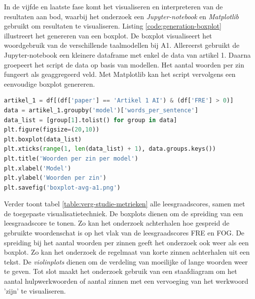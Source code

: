 In de vijfde en laatste fase komt het visualiseren en interpreteren van de resultaten aan bod, waarbij het onderzoek een \textit{Jupyter-notebook} en \textit{Matplotlib} gebruikt om resultaten te visualiseren. Listing \ref{code:generation-boxplot} illustreert het genereren van een boxplot. De boxplot visualiseert het woordgebruik van de verschillende taalmodellen bij A1. Allereerst gebruikt de Jupyter-notebook een kleinere dataframe met enkel de data van artikel 1. Daarna groepeert het script de data op basis van modellen. Het aantal woorden per zin fungeert als geaggregeerd veld. Met Matplotlib kan het script vervolgens een eenvoudige boxplot genereren.


\begin{lstlisting}[language=Python, caption={Code om een boxplot voor het aantal woorden per zin te genereren.}, label={code:generation-boxplot}]	
artikel_1 = df[(df['paper'] == 'Artikel 1 AI') & (df['FRE'] > 0)]
data = artikel_1.groupby('model')['words_per_sentence']
data_list = [group[1].tolist() for group in data]
plt.figure(figsize=(20,10))
plt.boxplot(data_list)
plt.xticks(range(1, len(data_list) + 1), data.groups.keys())
plt.title('Woorden per zin per model')
plt.xlabel('Model')
plt.ylabel('Woorden per zin')
plt.savefig('boxplot-avg-a1.png')
\end{lstlisting}

Verder toont tabel \ref{table:verg-studie-metrieken} alle leesgraadscores, samen met de toegepaste visualisatietechniek. De boxplots dienen om de spreiding van een leesgraadscore te tonen. Zo kan het onderzoek achterhalen hoe gespreid de gebruikte woordenschat is op het vlak van de leesgraadscores FRE en FOG. De spreiding bij het aantal woorden per zinnen geeft het onderzoek ook weer als een boxplot. Zo kan het onderzoek de regelmaat van korte zinnen achterhalen uit een tekst. De \textit{violinplots} dienen om de verdeling van moeilijke of lange woorden weer te geven. Tot slot maakt het onderzoek gebruik van een staafdiagram om het aantal hulpwerkwoorden of aantal zinnen met een vervoeging van het werkwoord 'zijn' te visualiseren.

